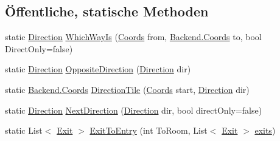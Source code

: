 \subsection*{Öffentliche, statische Methoden}
\begin{DoxyCompactItemize}
\item 
static \hyperlink{namespace_gruppe22_1_1_backend_a2d53d5d14b8ea0951ba6971e5da1ebf5}{Direction} \hyperlink{class_gruppe22_1_1_backend_1_1_map_ab84aa5963511604d27923fd9b7194d0f}{Which\-Way\-Is} (\hyperlink{class_gruppe22_1_1_backend_1_1_coords}{Coords} from, \hyperlink{class_gruppe22_1_1_backend_1_1_coords}{Backend.\-Coords} to, bool Direct\-Only=false)
\item 
static \hyperlink{namespace_gruppe22_1_1_backend_a2d53d5d14b8ea0951ba6971e5da1ebf5}{Direction} \hyperlink{class_gruppe22_1_1_backend_1_1_map_a90ad354d8da1ed9aa2cfac631edc864a}{Opposite\-Direction} (\hyperlink{namespace_gruppe22_1_1_backend_a2d53d5d14b8ea0951ba6971e5da1ebf5}{Direction} dir)
\item 
static \hyperlink{class_gruppe22_1_1_backend_1_1_coords}{Backend.\-Coords} \hyperlink{class_gruppe22_1_1_backend_1_1_map_a81136519b96adecb02bfd5552f5b55d3}{Direction\-Tile} (\hyperlink{class_gruppe22_1_1_backend_1_1_coords}{Coords} start, \hyperlink{namespace_gruppe22_1_1_backend_a2d53d5d14b8ea0951ba6971e5da1ebf5}{Direction} dir)
\item 
static \hyperlink{namespace_gruppe22_1_1_backend_a2d53d5d14b8ea0951ba6971e5da1ebf5}{Direction} \hyperlink{class_gruppe22_1_1_backend_1_1_map_ad56a1c4f4d9e9b1feb66d631e807ce56}{Next\-Direction} (\hyperlink{namespace_gruppe22_1_1_backend_a2d53d5d14b8ea0951ba6971e5da1ebf5}{Direction} dir, bool direct\-Only=false)
\item 
static List$<$ \hyperlink{class_gruppe22_1_1_backend_1_1_exit}{Exit} $>$ \hyperlink{class_gruppe22_1_1_backend_1_1_map_aaa0f3a0e9da112f1e60e04b5e2668bef}{Exit\-To\-Entry} (int To\-Room, List$<$ \hyperlink{class_gruppe22_1_1_backend_1_1_exit}{Exit} $>$ \hyperlink{class_gruppe22_1_1_backend_1_1_map_a0dc104d0e3f5896a272e4ed47dd79378}{exits})
\end{DoxyCompactItemize}
